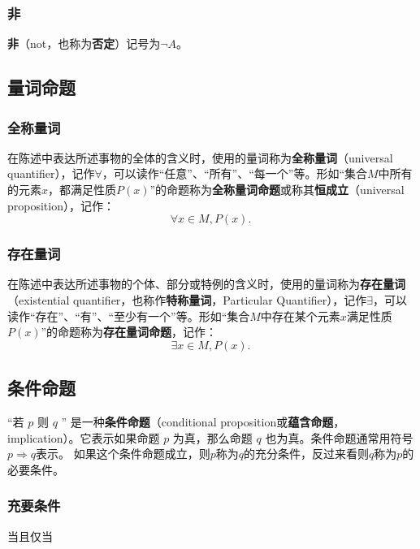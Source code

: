 \subsubsection{非}
\textbf{非}（not，也称为\textbf{否定}）记号为$\lnot A$。

\subsection{量词命题}

\subsubsection{全称量词}

在陈述中表达所述事物的全体的含义时，使用的量词称为\textbf{全称量词}（universal quantifier），记作$\forall$，可以读作“任意”、“所有”、“每一个”等。形如“集合$M$中所有的元素$x$，都满足性质$P(x)$”的命题称为\textbf{全称量词命题}或称其\textbf{恒成立}（universal proposition），记作：
\begin{equation}
\forall x\in M,P(x).~
\end{equation}


\subsubsection{存在量词}

在陈述中表达所述事物的个体、部分或特例的含义时，使用的量词称为\textbf{存在量词}（existential quantifier，也称作\textbf{特称量词}，Particular Quantifier），记作$\exists$，可以读作“存在”、“有”、“至少有一个”等。形如“集合$M$中存在某个元素$x$满足性质$P(x)$”的命题称为\textbf{存在量词命题}，记作：
\begin{equation}
\exists x\in M,P(x).~
\end{equation}

\subsection{条件命题}
“若  $p$  则  $q$ ” 是一种\textbf{条件命题}（conditional proposition或\textbf{蕴含命题}，implication）。它表示如果命题  $p$  为真，那么命题  $q$  也为真。条件命题通常用符号$p\Rightarrow q$表示。
如果这个条件命题成立，则$p$称为$q$的充分条件，反过来看则$q$称为$p$的必要条件。

\subsubsection{充要条件}
当且仅当

